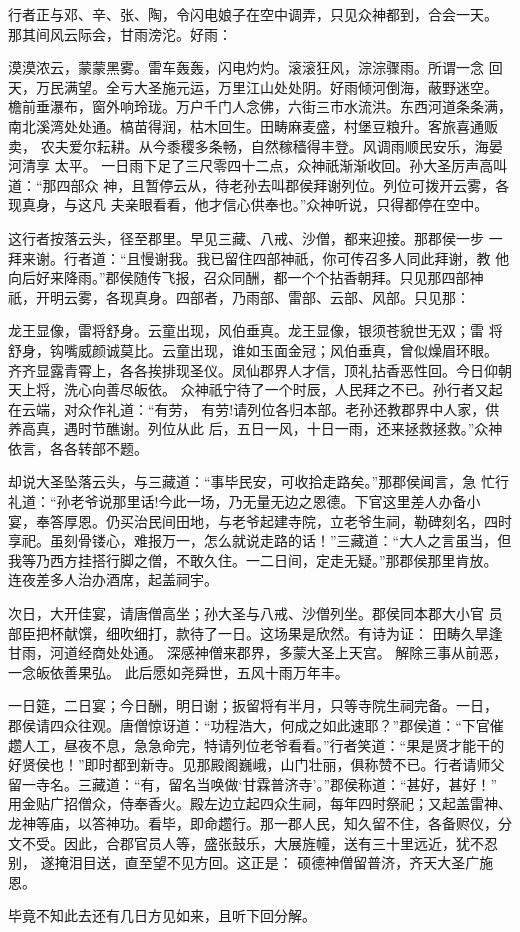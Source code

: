 行者正与邓、辛、张、陶，令闪电娘子在空中调弄，只见众神都到，合会一天。
那其间风云际会，甘雨滂沱。好雨：

漠漠浓云，蒙蒙黑雾。雷车轰轰，闪电灼灼。滚滚狂风，淙淙骤雨。所谓一念
回天，万民满望。全亏大圣施元运，万里江山处处阴。好雨倾河倒海，蔽野迷空。
檐前垂瀑布，窗外响玲珑。万户千门人念佛，六街三市水流洪。东西河道条条满，
南北溪湾处处通。槁苗得润，枯木回生。田畴麻麦盛，村堡豆粮升。客旅喜通贩卖，
农夫爱尔耘耕。从今黍稷多条畅，自然稼穑得丰登。风调雨顺民安乐，海晏河清享
太平。
一日雨下足了三尺零四十二点，众神祇渐渐收回。孙大圣厉声高叫道：“那四部众
神，且暂停云从，待老孙去叫郡侯拜谢列位。列位可拨开云雾，各现真身，与这凡
夫亲眼看看，他才信心供奉也。”众神听说，只得都停在空中。

这行者按落云头，径至郡里。早见三藏、八戒、沙僧，都来迎接。那郡侯一步
一拜来谢。行者道：“且慢谢我。我已留住四部神祇，你可传召多人同此拜谢，教
他向后好来降雨。”郡侯随传飞报，召众同酬，都一个个拈香朝拜。只见那四部神
祇，开明云雾，各现真身。四部者，乃雨部、雷部、云部、风部。只见那：

龙王显像，雷将舒身。云童出现，风伯垂真。龙王显像，银须苍貌世无双；雷
将舒身，钩嘴威颜诚莫比。云童出现，谁如玉面金冠；风伯垂真，曾似燥眉环眼。
齐齐显露青霄上，各各挨排现圣仪。凤仙郡界人才信，顶礼拈香恶性回。今日仰朝
天上将，洗心向善尽皈依。
众神祇宁待了一个时辰，人民拜之不已。孙行者又起在云端，对众作礼道：“有劳，
有劳!请列位各归本部。老孙还教郡界中人家，供养高真，遇时节醮谢。列位从此
后，五日一风，十日一雨，还来拯救拯救。”众神依言，各各转部不题。

却说大圣坠落云头，与三藏道：“事毕民安，可收拾走路矣。”那郡侯闻言，急
忙行礼道：“孙老爷说那里话!今此一场，乃无量无边之恩德。下官这里差人办备小
宴，奉答厚恩。仍买治民间田地，与老爷起建寺院，立老爷生祠，勒碑刻名，四时
享祀。虽刻骨镂心，难报万一，怎么就说走路的话！”三藏道：“大人之言虽当，但
我等乃西方挂搭行脚之僧，不敢久住。一二日间，定走无疑。”那郡侯那里肯放。
连夜差多人治办酒席，起盖祠宇。

次日，大开佳宴，请唐僧高坐；孙大圣与八戒、沙僧列坐。郡侯同本郡大小官
员部臣把杯献馔，细吹细打，款待了一日。这场果是欣然。有诗为证：
田畴久旱逢甘雨，河道经商处处通。
深感神僧来郡界，多蒙大圣上天宫。
解除三事从前恶，一念皈依善果弘。
此后愿如尧舜世，五风十雨万年丰。

一日筵，二日宴；今日酬，明日谢；扳留将有半月，只等寺院生祠完备。一日，
郡侯请四众往观。唐僧惊讶道：“功程浩大，何成之如此速耶？”郡侯道：“下官催
趱人工，昼夜不息，急急命完，特请列位老爷看看。”行者笑道：“果是贤才能干的
好贤侯也！”即时都到新寺。见那殿阁巍峨，山门壮丽，俱称赞不已。行者请师父
留一寺名。三藏道：“有，留名当唤做‘甘霖普济寺’。”郡侯称道：“甚好，甚好！”
用金贴广招僧众，侍奉香火。殿左边立起四众生祠，每年四时祭祀；又起盖雷神、
龙神等庙，以答神功。看毕，即命趱行。那一郡人民，知久留不住，各备赆仪，分
文不受。因此，合郡官员人等，盛张鼓乐，大展旌幢，送有三十里远近，犹不忍别，
遂掩泪目送，直至望不见方回。这正是：
硕德神僧留普济，齐天大圣广施恩。

毕竟不知此去还有几日方见如来，且听下回分解。